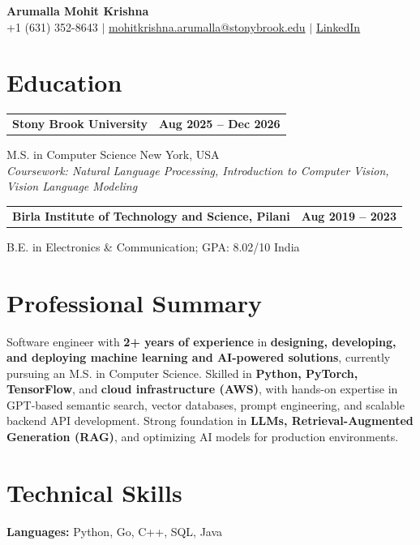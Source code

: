 \documentclass[letterpaper,10pt]{article}
\makeatletter
\newcommand{\entry}[2]{%
  \noindent
  \begin{tabularx}{\linewidth}
    {@{}>{\raggedright\arraybackslash}X@{\hspace{6pt}}r@{}}
    \textbf{#1} & #2
  \end{tabularx}\par
}
\makeatother
\begin{document}
\begin{center}
    {\LARGE\bfseries Arumalla Mohit Krishna}\\[3pt]
    +1 (631) 352-8643 $|$
    \href{mailto:mohitkrishna.arumalla@stonybrook.edu}
    {mohitkrishna.arumalla@stonybrook.edu} $|$
    \href{https://linkedin.com/in/mohit-krishna-arumalla}
    {LinkedIn}
\end{center}
\vspace{-8pt}

\section{Education}

\entry
  {\textbf{Stony Brook University}}
  {\textbf{Aug 2025 -- Dec 2026}}

M.S. in Computer Science \hfill New York, USA\\
\textit{
Coursework: Natural Language Processing,
Introduction to Computer Vision, Vision Language Modeling
}
\vspace{3pt}

\entry
  {\textbf{Birla Institute of Technology and Science, Pilani}}
  {\textbf{Aug 2019 -- 2023}}

B.E. in Electronics \& Communication; GPA: 8.02/10 \hfill India
\section{Professional Summary}

Software engineer with \textbf{2+ years of experience} in \textbf{designing, developing, and deploying machine learning and AI-powered solutions}, currently pursuing an M.S. in Computer Science. Skilled in \textbf{Python, PyTorch, TensorFlow}, and \textbf{cloud infrastructure (AWS)}, with hands-on expertise in GPT-based semantic search, vector databases, prompt engineering, and scalable backend API development. Strong foundation in \textbf{LLMs, Retrieval-Augmented Generation (RAG)}, and optimizing AI models for production environments.

\section{Technical Skills}

\textbf{Languages:}
Python, Go, C++, SQL, Java\\
\end{document}
